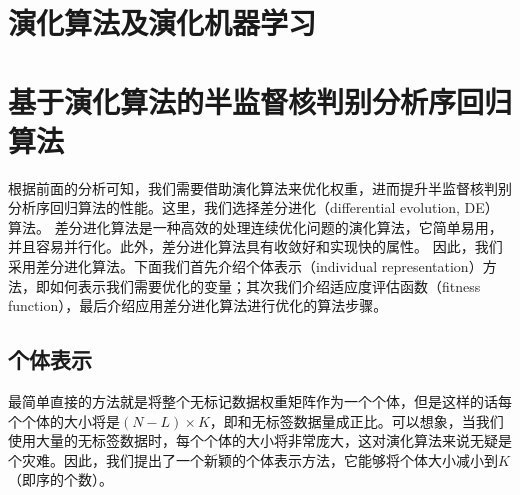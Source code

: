 \section{演化算法及演化机器学习}

\section{基于演化算法的半监督核判别分析序回归算法}
根据前面的分析可知，我们需要借助演化算法来优化权重，进而提升半监督核判别分析序回归算法的性能。这里，我们选择差分进化（differential evolution, DE）算法\citep{storn1997differential}。
差分进化算法是一种高效的处理连续优化问题的演化算法，它简单易用，并且容易并行化。此外，差分进化算法具有收敛好和实现快的属性\citep{price2006differential}。
因此，我们采用差分进化算法。下面我们首先介绍个体表示（individual representation）方法，即如何表示我们需要优化的变量；其次我们介绍适应度评估函数（fitness function），最后介绍应用差分进化算法进行优化的算法步骤。

\subsection{个体表示}
最简单直接的方法就是将整个无标记数据权重矩阵作为一个个体，但是这样的话每个个体的大小将是\((N-L)\times K\)，即和无标签数据量成正比。可以想象，当我们使用大量的无标签数据时，每个个体的大小将非常庞大，这对演化算法来说无疑是个灾难。因此，我们提出了一个新颖的个体表示方法，它能够将个体大小减小到\(K\)（即序的个数）。

